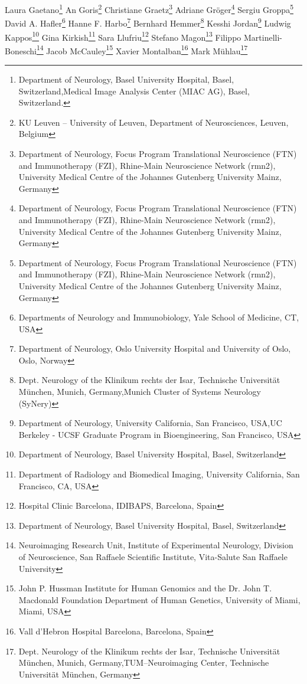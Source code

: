 Laura Gaetano\footnote[6,18]{Department of Neurology, Basel University Hospital, Basel, Switzerland,Medical Image Analysis Center (MIAC AG), Basel, Switzerland.}
An Goris\footnote[14]{ KU Leuven – University of Leuven, Department of Neurosciences, Leuven, Belgium}
Christiane Graetz\footnote[16]{Department of Neurology, Focus Program Translational Neuroscience (FTN) and Immunotherapy (FZI), Rhine-Main Neuroscience Network (rmn2), University Medical Centre of the Johannes Gutenberg University Mainz, Germany}
Adriane Gröger\footnote[16]{Department of Neurology, Focus Program Translational Neuroscience (FTN) and Immunotherapy (FZI), Rhine-Main Neuroscience Network (rmn2), University Medical Centre of the Johannes Gutenberg University Mainz, Germany}
Sergiu Groppa\footnote[16]{Department of Neurology, Focus Program Translational Neuroscience (FTN) and Immunotherapy (FZI), Rhine-Main Neuroscience Network (rmn2), University Medical Centre of the Johannes Gutenberg University Mainz, Germany}
David A. Hafler\footnote[19]{Departments of Neurology and Immunobiology, Yale School of Medicine, CT, USA}
Hanne F. Harbo\footnote[20]{Department of Neurology, Oslo University Hospital and University of Oslo, Oslo, Norway}
Bernhard Hemmer\footnote[21,22]{Dept. Neurology of the  Klinikum rechts der Isar, Technische Universität München, Munich, Germany,Munich Cluster of Systems Neurology (SyNery)}
Kesshi Jordan\footnote[1,2]{Department of Neurology, University California, San Francisco,  USA,UC Berkeley - UCSF Graduate Program in Bioengineering, San Francisco, USA}
Ludwig Kappos\footnote[6]{Department of Neurology, Basel University Hospital, Basel, Switzerland}
Gina Kirkish\footnote[11]{Department of Radiology and Biomedical Imaging, University California, San Francisco, CA, USA}
Sara Llufriu\footnote[23]{Hospital Clinic Barcelona, IDIBAPS, Barcelona, Spain}
Stefano Magon\footnote[6]{Department of Neurology, Basel University Hospital, Basel, Switzerland}
Filippo Martinelli-Boneschi\footnote[15]{Neuroimaging Research Unit, Institute of Experimental Neurology, Division of Neuroscience, San Raffaele Scientific Institute, Vita-Salute San Raffaele University}
Jacob McCauley\footnote[24]{John P. Hussman Institute for Human Genomics and the Dr. John T. Macdonald Foundation Department of Human Genetics, University of Miami, Miami, USA}
Xavier Montalban\footnote[10]{Vall d’Hebron Hospital Barcelona, Barcelona, Spain}
Mark Mühlau\footnote[21,25]{Dept. Neurology of the  Klinikum rechts der Isar, Technische Universität München, Munich, Germany,TUM–Neuroimaging Center, Technische Universität München, Germany}
